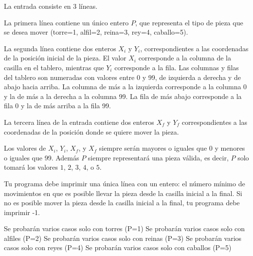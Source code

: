 \documentclass{oci}
\begin{document}
\begin{inputDescription}
  La entrada consiste en 3 líneas.
  
  La primera línea contiene un único entero $P$, que representa el tipo de pieza que se desea mover (torre=1, alfil=2, reina=3, rey=4, caballo=5).
  
  La segunda línea contiene dos enteros $X_{i}$ y $Y_{i}$, correspondientes a las coordenadas de la posición inicial de la pieza.
  El valor $X_{i}$ corresponde a la columna de la casilla en el tablero, mientras que $Y_{i}$ corresponde a la fila.
  Las columnas y filas del tablero son numeradas con valores entre 0 y 99, de izquierda a derecha y de abajo hacia arriba.
  La columna de más a la izquierda corresponde a la columna 0 y la de más a la derecha a la columna 99.
  La fila de más abajo corresponde a la fila 0 y la de más arriba a la fila 99.
  
  La tercera línea de la entrada contiene dos enteros $X_{f}$ y $Y_{f}$ correspondientes a las coordenadas de la posición donde se quiere mover la pieza.
  
  Los valores de $X_i$, $Y_i$, $X_f$, y $X_f$ siempre serán mayores o iguales que 0 y menores o iguales que 99.
  Además $P$ siempre representará una pieza válida, es decir, $P$ solo tomará los valores $1$, $2$, $3$, $4$, o $5$.
\end{inputDescription}

\begin{outputDescription}
  Tu programa debe imprimir una única línea con un entero: el número mínimo de movimientos en que es posible llevar la pieza desde la casilla inicial a la final.
  Si no es posible mover la pieza desde la casilla inicial a la final, tu programa debe imprimir -1.
\end{outputDescription}

\begin{scoreDescription}
   Se probarán varios casos solo con torres (P=1)
   Se probarán varios casos solo con alfiles (P=2)
   Se probarán varios casos solo con reinas (P=3)
   Se probarán varios casos solo con reyes (P=4)
   Se probarán varios casos solo con caballos (P=5)
\end{scoreDescription}

\begin{sampleDescription}
\end{sampleDescription}
\end{document}
